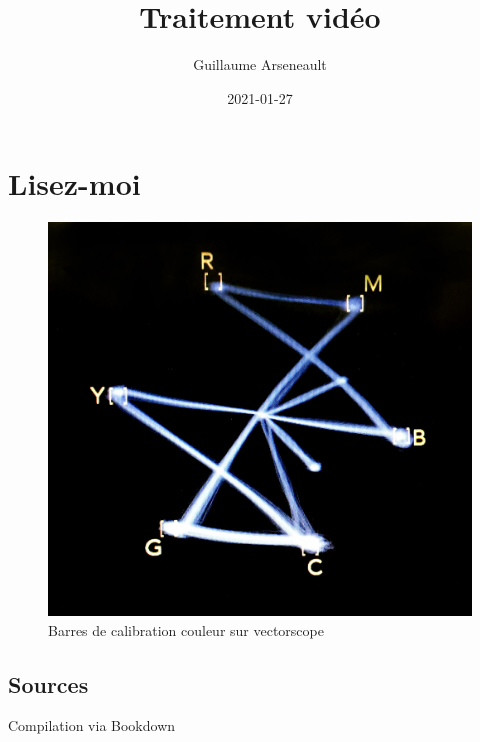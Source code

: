 \documentclass[
]{book}
\title{Traitement vidéo}
\author{Guillaume Arseneault}
\date{2021-01-27}
\begin{document}
\maketitle

{
\setcounter{tocdepth}{1}
\tableofcontents
}
\hypertarget{lisez-moi}{%
\chapter*{Lisez-moi}\label{lisez-moi}}

\begin{figure}
\centering
\includegraphics{images/vectorscope.jpg}
\caption{\label{fig:unnamed-chunk-1}Barres de calibration couleur sur vectorscope \citep{marsh_ColorBarsVectorscope_2016}}
\end{figure}

\hypertarget{sources}{%
\section*{Sources}\label{sources}}

Compilation via Bookdown \citep{xie_BookdownAuthoringBooks_2020}
\end{document}

